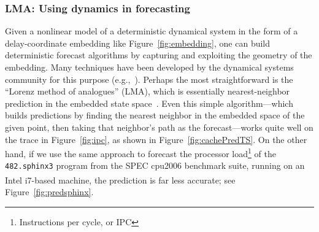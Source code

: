  \subsubsection{LMA: Using dynamics in forecasting}

Given a nonlinear model of a deterministic dynamical system in the
form of a delay-coordinate embedding like Figure~\ref{fig:embedding},
one can build deterministic forecast algorithms by capturing and
exploiting the geometry of the embedding.  Many techniques have been
developed by the dynamical systems community for this purpose
(e.g.,~\cite{casdagli-eubank92,weigend-book}).  Perhaps the most straightforward
is the ``Lorenz method of analogues'' (LMA), which is essentially
nearest-neighbor prediction in the embedded state
space~\cite{lorenz-analogues}.  Even this simple algorithm---which
builds predictions by finding the nearest neighbor in the embedded
space of the given point, then taking that neighbor's path as the
forecast---works quite well on the trace in Figure~\ref{fig:ipc}, as
shown in Figure~\ref{fig:cachePredTS}.
%
%
On the other hand, if we use the same approach to forecast the
processor load\footnote{Instructions per cycle, or IPC} of the {\tt
  482.sphinx3} program from the SPEC cpu2006 benchmark suite, running
on an Intel i7\textsuperscript{\textregistered}-based machine, the
prediction is far less accurate; see Figure~\ref{fig:predsphinx}.
%

